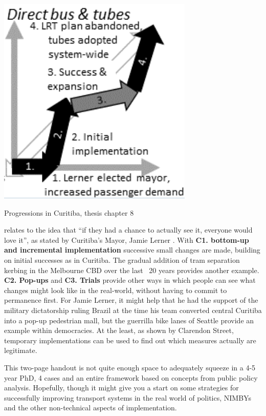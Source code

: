 \documentclass[nobib]{tufte-handout}
\begin{document}
\begin{marginfigure}
        \includegraphics[width=\linewidth]{Curitiba_3}
  \caption{Progressions in Curitiba, thesis chapter 8}
  \label{fig:Curitiba}
\end{marginfigure}

 relates to the idea that “if they had a chance to actually see it, everyone would love it”, as stated by Curitiba's Mayor, Jamie Lerner \citep{McKibben:2007aa}. With \textbf{C1. bottom-up and incremental implementation} successive small changes are made, building on initial successes as in Curitiba. The gradual addition of tram separation kerbing in the Melbourne CBD over the last ~20 years provides another example. \textbf{C2. Pop-ups} and \textbf{C3. Trials} provide other ways in which people can see what changes might look like in the real-world, without having to commit to permanence first.  For Jamie Lerner, it might help that he had the support of the military dictatorship ruling Brazil at the time his team converted central Curitiba into a pop-up pedestrian mall, but the guerrilla bike lanes of Seattle\citep{Fucoloro:2013aa} provide an example within democracies. At the least, as shown by Clarendon Street\citep{Silkstone:2005aa}, temporary implementations can be used to find out which measures actually are legitimate.

This two-page handout is not quite enough space to adequately squeeze in a 4-5 year PhD, 4 cases and an entire framework based on concepts from public policy analysis. Hopefully, though it might give you a start on some strategies for successfully improving transport systems in the real world of politics, NIMBYs and the other non-technical aspects of implementation. 



\end{document}
